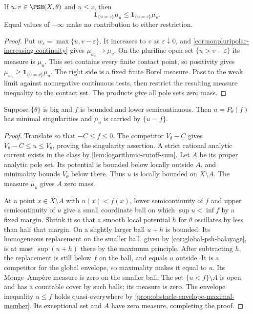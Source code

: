 \begin{lemma}\label{lem:ordered-potential-contact-measure}
If $u,v\in\PSH(X,\theta)$ and $u\leq v$, then
\[
 \mathbf1_{\{u=v\}}\mu_u\leq\mathbf1_{\{u=v\}}\mu_v.
\]
Equal values of $-\infty$ make no contribution to either restriction.
\end{lemma}
\begin{proof}
Put $w_\varepsilon=\max\{u,v-\varepsilon\}$. It increases to $v$ as $\varepsilon\downarrow0$, and \cref{cor:nonpluripolar-increasing-continuity} gives $\mu_{w_\varepsilon}\to\mu_v$. On the plurifine open set $\{u>v-\varepsilon\}$ its measure is $\mu_u$. This set contains every finite contact point, so positivity gives
$\mu_{w_\varepsilon}\geq\mathbf1_{\{u=v\}}\mu_u$.
The right side is a fixed finite Borel measure. Pass to the weak limit against nonnegative continuous tests, then restrict the resulting measure inequality to the contact set. The products give all pole sets zero mass.
\end{proof}

\begin{lemma}\label{lem:bounded-lsc-obstacle-contact}
Suppose $\{\theta\}$ is big and $f$ is bounded and lower semicontinuous. Then $u=P_\theta(f)$ has minimal singularities and $\mu_u$ is carried by $\{u=f\}$.
\end{lemma}
\begin{proof}
Translate so that $-C\leq f\leq0$. The competitor $V_\theta-C$ gives
$V_\theta-C\leq u\leq V_\theta$, proving the singularity assertion. A strict rational analytic current exists in the class by \cref{lem:logarithmic-cutoff-sum}. Let $A$ be its proper analytic pole set. Its potential is bounded below locally outside $A$, and minimality bounds $V_\theta$ below there. Thus $u$ is locally bounded on $X\setminus A$. The measure $\mu_u$ gives $A$ zero mass.

At a point $x\in X\setminus A$ with $u(x)<f(x)$, lower semicontinuity of $f$ and upper semicontinuity of $u$ give a small coordinate ball on which $\sup u<\inf f$ by a fixed margin. Shrink it so that a smooth local potential $h$ for $\theta$ oscillates by less than half that margin. On a slightly larger ball $u+h$ is bounded. Its homogeneous replacement on the smaller ball, given by \cref{cor:global-psh-balayage}, is at most $\sup(u+h)$ there by the maximum principle. After subtracting $h$, the replacement is still below $f$ on the ball, and equals $u$ outside. It is a competitor for the global envelope, so maximality makes it equal to $u$. Its Monge--Amp\`ere measure is zero on the smaller ball. The set $\{u<f\}\setminus A$ is open and has a countable cover by such balls; its measure is zero. The envelope inequality $u\leq f$ holds quasi-everywhere by \cref{prop:obstacle-envelope-maximal-member}. Its exceptional set and $A$ have zero measure, completing the proof.
\end{proof}

